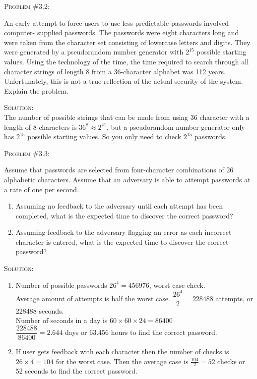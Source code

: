 \documentclass[12pt]{article}
\newenvironment{problem}[1]
{\begin{mdframed}[linewidth=0.8pt]
        \textsc{Problem #1:}

}
    {\end{mdframed}}
\newenvironment{solution}
    {\textsc{Solution:}\\}
    {\newpage}%
\begin{document}
	\begin{problem}{\#3.2}
		An early attempt to force users to use less predictable passwords involved
		computer- supplied passwords. The passwords were eight characters long and
		were taken from the character set consisting of lowercase letters and digits.
		They were generated by a pseudorandom number generator with $2^{15}$ possible
		starting values. Using the technology of the time, the time required to
		search through all character strings of length 8 from a 36-character alphabet
		was 112 years. Unfortunately, this is not a true reflection of the actual
		security of the system. Explain the problem.
	\end{problem}
	\begin{solution}
		The number of possible strings that can be made from using 36 character with
		a length of 8 characters is $36^8 \approx 2^{41}$, but a pseudorandom number
		generator only has $2^{15}$ possible starting values. So you only need to check
		$2^{15}$ passwords.
	\end{solution}
	

	\begin{problem}{\#3.3}
		Assume that passwords are selected from four-character combinations of 26
		alphabetic characters. Assume that an adversary is able to attempt passwords
		at a rate of one per second.
		\begin{enumerate}[label=\alph*]
			\item Assuming no feedback to the adversary until each attempt has
				been completed, what is the expected time to discover the
				correct password?
			\item Assuming feedback to the adversary flagging an error as each
				incorrect character is entered, what is the expected time
				to discover the correct password? 
		\end{enumerate}
	\end{problem}
	\begin{solution}
		\begin{enumerate}[label=\alph*]
			\item Number of possible passwords $26^4 = 456976$, worst case check.\\
				Average amount of attempts is half the worst case.
				$\dfrac{26^4}{2}=228488$ attempts, or 228488 seconds.\\
				Number of seconds in a day is $60 \times 60\times 24 =86400$\\
				$\dfrac{228488}{86400} = 2.644$ days or $63.456$ hours to find the
				correct password.
			\item If user gets feedback with each character then the number of checks is
				$26 \times 4 = 104$ for the worst case. Then the average case is
				$\frac{104}{2}= 52$ checks or 52 seconds to find the correct password.
		\end{enumerate}
	\end{solution}
\end{document}

